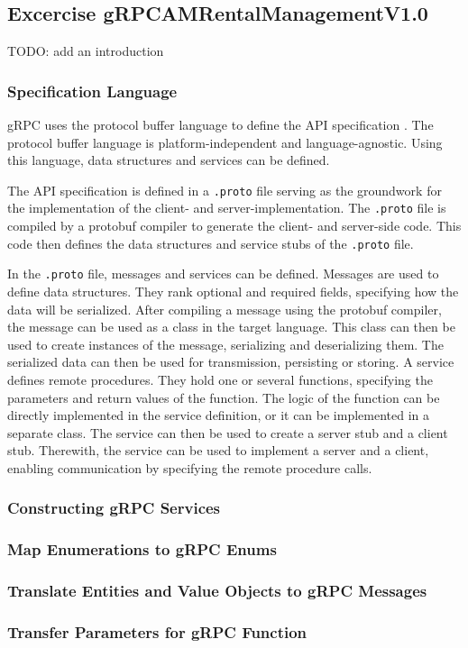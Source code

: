 \subsection{Excercise gRPCAMRentalManagementV1.0}
TODO: add an introduction

\subsubsection*{Specification Language}
gRPC uses the protocol buffer language to define the API specification \cite{PRO-DOC}.
The protocol buffer language is platform-independent and language-agnostic.
Using this language, data structures and services can be defined.

The API specification is defined in a \texttt{.proto} file serving as the groundwork for the implementation of the client- and server-implementation.
The \texttt{.proto} file is compiled by a protobuf compiler to generate the client- and server-side code.
This code then defines the data structures and service stubs of the \texttt{.proto} file.

In the \texttt{.proto} file, messages and services can be defined.
Messages are used to define data structures.
They rank optional and required fields, specifying how the data will be serialized.
After compiling a message using the protobuf compiler, the message can be used as a class in the target language.
This class can then be used to create instances of the message, serializing and deserializing them.
The serialized data can then be used for transmission, persisting or storing.
A service defines remote procedures.
They hold one or several functions, specifying the parameters and return values of the function.
The logic of the function can be directly implemented in the service definition, or it can be implemented in a separate class.
The service can then be used to create a server stub and a client stub.
Therewith, the service can be used to implement a server and a client, enabling communication by specifying the remote procedure calls.

\subsubsection*{Constructing gRPC Services}

\subsubsection*{Map Enumerations to gRPC Enums}

\subsubsection*{Translate Entities and Value Objects to gRPC Messages}

\subsubsection*{Transfer Parameters for gRPC Function}